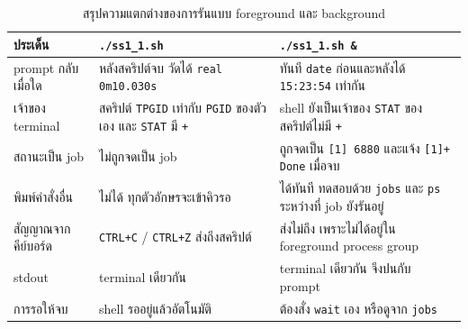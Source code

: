 \documentclass[a4paper,11pt]{article}
\newcommand{\code}[1]{\texttt{#1}}
\begin{document}
\begin{table}[H]
\centering\small
\caption{สรุปความแตกต่างของการรันแบบ foreground และ background}
\begin{tabular}{p{2.8cm}p{5.5cm}p{5.5cm}}
\toprule
\textbf{ประเด็น} & \textbf{\code{./ss1\_1.sh}} & \textbf{\code{./ss1\_1.sh \&}} \\
\midrule
prompt กลับเมื่อใด & หลังสคริปต์จบ วัดได้ \code{real 0m10.030s} & ทันที \code{date} ก่อนและหลังได้ \code{15:23:54} เท่ากัน \\
เจ้าของ terminal & สคริปต์ \code{TPGID} เท่ากับ \code{PGID} ของตัวเอง และ \code{STAT} มี \code{+} & shell ยังเป็นเจ้าของ \code{STAT} ของสคริปต์ไม่มี \code{+} \\
สถานะเป็น job & ไม่ถูกจดเป็น job & ถูกจดเป็น \code{[1] 6880} และแจ้ง \code{[1]+ Done} เมื่อจบ \\
พิมพ์คำสั่งอื่น & ไม่ได้ ทุกตัวอักษรจะเข้าคิวรอ & ได้ทันที ทดสอบด้วย \code{jobs} และ \code{ps} ระหว่างที่ job ยังรันอยู่ \\
สัญญาณจากคีย์บอร์ด & \code{CTRL+C} / \code{CTRL+Z} ส่งถึงสคริปต์ & ส่งไม่ถึง เพราะไม่ได้อยู่ใน foreground process group \\
stdout & terminal เดียวกัน & terminal เดียวกัน จึงปนกับ prompt \\
การรอให้จบ & shell รออยู่แล้วอัตโนมัติ & ต้องสั่ง \code{wait} เอง หรือดูจาก \code{jobs} \\
\bottomrule
\end{tabular}
\end{table}
\end{document}

